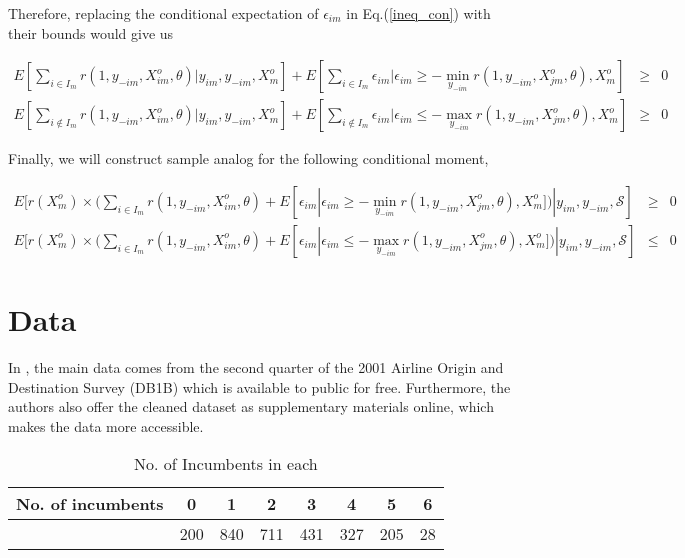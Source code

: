 \documentclass[draft]{article}
\begin{document}
Therefore, replacing the conditional expectation of $\epsilon_{im}$ in Eq.(\ref{ineq_con}) with their bounds would give us 



\begin{equation}
\begin{array}{rcl}
\displaystyle E[\sum_{i \in I_m}r(1,y_{-im},X^o_{im},\theta)| y_{im}, y_{-im}, X^o_{m}]+ E[\sum_{i \in I_m}\epsilon_{im} |\epsilon_{im} \geq - \min_{y_{-im}}r(1,y_{-im},X^o_{jm},\theta), X^o_{m}] &\geq& 0 \\ 
\displaystyle E[\sum_{i \not\in I_m} r(1,y_{-im},X^o_{im},\theta)| y_{im}, y_{-im}, X^o_{m}]+ E[\sum_{i \not\in I_m} \epsilon_{im} |\epsilon_{im} \leq - \max_{y_{-im}}r(1,y_{-im},X^o_{jm},\theta), X^o_{m}] &\geq& 0
\end{array}
\label{ineq_con_bound}
\end{equation}

\bigskip

Finally, we will construct sample analog for the following conditional moment,

$$
\begin{array}{rcl}
\displaystyle E[r(X^o_m) \times (\sum_{i \in I_m}r(1,y_{-im},X^o_{im},\theta) + E [\epsilon_{im} |\epsilon_{im} \geq - \min_{y_{-im}}r(1,y_{-im},X^o_{jm},\theta), X^o_{m}] )|y_{im}, y_{-im}, \mathcal{S}] &\geq& 0 \\
\displaystyle E[r(X^o_m) \times (\sum_{i \in I_m}r(1,y_{-im},X^o_{im},\theta) + E [\epsilon_{im} |\epsilon_{im} \leq - \max_{y_{-im}}r(1,y_{-im},X^o_{jm},\theta), X^o_{m}] )|y_{im}, y_{-im}, \mathcal{S}] &\leq& 0
\end{array}
$$


\section{Data}

In \cite{ciliberto2009market}, the main data comes from the second quarter of the 2001 Airline Origin and Destination Survey (DB1B) which is available to public for free. Furthermore, the authors also offer the cleaned dataset as supplementary materials online, which makes the data more accessible. 

\begin{table}[h!]
\centering
\caption{No. of Incumbents in each }
\begin{tabular}{cccccccc} 
 \hline
 No. of incumbents & 0 & 1 & 2 & 3 & 4 & 5 & 6 \\ 
 \hline
 & 200 & 840 & 711 & 431 & 327 & 205 & 28 \\ 
 \hline
\end{tabular}
\label{no.of.icb}

\end{table}
\end{document}
